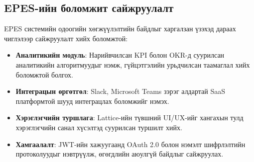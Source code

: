 \subsection{EPES-ийн боломжит сайжруулалт}
EPES системийн одоогийн хөгжүүлэлтийн байдлыг харгалзан үзэхэд дараах чиглэлээр сайжруулалт хийх боломжтой:
\begin{itemize}
    \item \textbf{Аналитикийн модуль}: Нарийвчилсан KPI болон OKR-д суурилсан аналитикийн алгоритмуудыг нэмж, гүйцэтгэлийн урьдчилсан таамаглал хийх боломжтой болгох.
    \item \textbf{Интеграцын өргөтгөл}: Slack, Microsoft Teams зэрэг алдартай SaaS платформтой шууд интеграцлах боломжийг нэмэх.
    \item \textbf{Хэрэглэгчийн туршлага}: Lattice-ийн түвшний UI/UX-ийг хангахын тулд хэрэглэгчийн санал хүсэлтэд суурилсан туршилт хийх.
    \item \textbf{Хамгаалалт}: JWT-ийн хажуугаанд OAuth 2.0 болон нэмэлт шифрлэлтийн протоколуудыг нэвтрүүлж, өгөгдлийн аюулгүй байдлыг сайжруулах.
\end{itemize}
